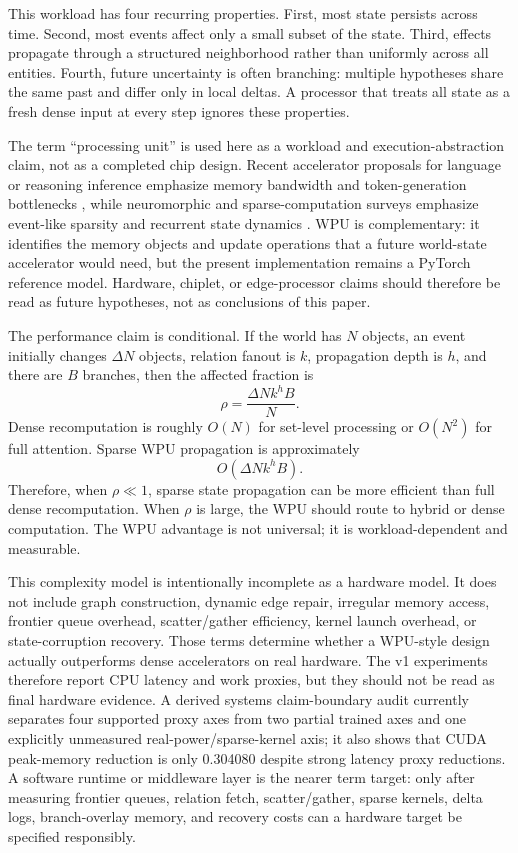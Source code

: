 \documentclass[11pt]{article}
\begin{document}
This workload has four recurring properties. First, most state persists across
time. Second, most events affect only a small subset of the state. Third,
effects propagate through a structured neighborhood rather than uniformly across
all entities. Fourth, future uncertainty is often branching: multiple
hypotheses share the same past and differ only in local deltas. A processor that
treats all state as a fresh dense input at every step ignores these properties.

The term ``processing unit'' is used here as a workload and execution-abstraction
claim, not as a completed chip design. Recent accelerator proposals for language
or reasoning inference emphasize memory bandwidth and token-generation
bottlenecks \cite{adiletta2026rpu}, while neuromorphic and sparse-computation
surveys emphasize event-like sparsity and recurrent state dynamics
\cite{simeone2026neuromorphic}. WPU is complementary: it identifies the memory
objects and update operations that a future world-state accelerator would need,
but the present implementation remains a PyTorch reference model. Hardware,
chiplet, or edge-processor claims should therefore be read as future hypotheses,
not as conclusions of this paper.

The performance claim is conditional. If the world has \(N\) objects, an event
initially changes \(\Delta N\) objects, relation fanout is \(k\), propagation
depth is \(h\), and there are \(B\) branches, then the affected fraction is
\[
\rho = \frac{\Delta N k^h B}{N}.
\]
Dense recomputation is roughly \(O(N)\) for set-level processing or \(O(N^2)\)
for full attention. Sparse WPU propagation is approximately
\[
O(\Delta N k^h B).
\]
Therefore, when \(\rho \ll 1\), sparse state propagation can be more efficient
than full dense recomputation. When \(\rho\) is large, the WPU should route to
hybrid or dense computation. The WPU advantage is not universal; it is
workload-dependent and measurable.

This complexity model is intentionally incomplete as a hardware model. It does
not include graph construction, dynamic edge repair, irregular memory access,
frontier queue overhead, scatter/gather efficiency, kernel launch overhead, or
state-corruption recovery. Those terms determine whether a WPU-style design
actually outperforms dense accelerators on real hardware. The v1 experiments
therefore report CPU latency and work proxies, but they should not be read as
final hardware evidence. A derived systems claim-boundary audit currently
separates four supported proxy axes from two partial trained axes and one
explicitly unmeasured real-power/sparse-kernel axis; it also shows that CUDA
peak-memory reduction is only 0.304080 despite strong latency proxy reductions.
A software runtime or middleware layer is the nearer
term target: only after measuring frontier queues, relation fetch, scatter/gather,
sparse kernels, delta logs, branch-overlay memory, and recovery costs can a
hardware target be specified responsibly.
\end{document}

